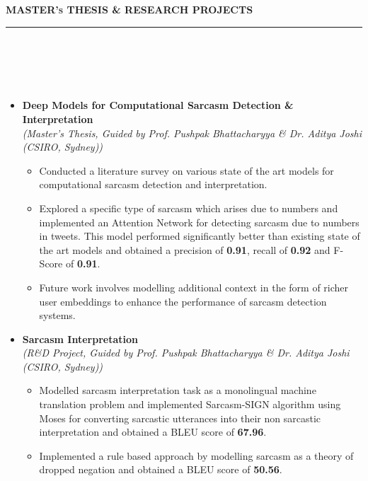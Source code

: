 \documentclass[a4paper,10pt]{article}
\newcommand{\isep}{-2 pt}
\newcommand{\lsep}{-0.5cm}
\newcommand{\resheading}[1]{{\small
        {
            \begin{minipage}
                {0.975\textwidth}\textbf{{\textsc{#1 \vphantom{p\^{E}} }}}
                \\[-0.3cm]
                \hrule
            \end{minipage}
            \\[-0.5cm]
        }
 }}
\begin{document}

\resheading{\textbf{\large MASTER's THESIS \& RESEARCH PROJECTS}}\\[\lsep]
\\[-0.4cm]
\begin{itemize}

\item \textbf{ Deep Models for Computational Sarcasm Detection \& Interpretation} \\ \emph{(Master's Thesis, Guided by Prof. Pushpak Bhattacharyya \& Dr. Aditya Joshi (CSIRO, Sydney))}
    \\ [-0.6cm]
    \begin{itemize}\itemsep \isep
    \item Conducted a literature survey on various state of the art models for computational sarcasm detection and interpretation.
    \item Explored a specific type of sarcasm which arises due to numbers and implemented an Attention Network for detecting sarcasm due to numbers in tweets. This model performed significantly better than existing state of the art models and obtained a precision of \textbf{0.91}, recall of \textbf{0.92} and F-Score of \textbf{0.91}.
    \item Future work involves modelling additional context in the form of richer user embeddings to enhance the performance of sarcasm detection systems.
    \end{itemize}

\item \textbf{Sarcasm Interpretation}
\\ {\emph{(R\&D Project, Guided by Prof. Pushpak Bhattacharyya \& Dr. Aditya Joshi (CSIRO, Sydney))}}
    \\ [-0.6cm]
    \begin{itemize}\itemsep \isep
    \item Modelled sarcasm interpretation task as a monolingual machine translation problem and implemented Sarcasm-SIGN algorithm using Moses for converting sarcastic utterances into their non sarcastic interpretation and obtained a BLEU score of \textbf{67.96}.
    \item Implemented a rule based approach by modelling sarcasm as a theory of dropped negation and obtained a BLEU score of \textbf{50.56}.

    \end{itemize}

\end{itemize}
\end{document}
